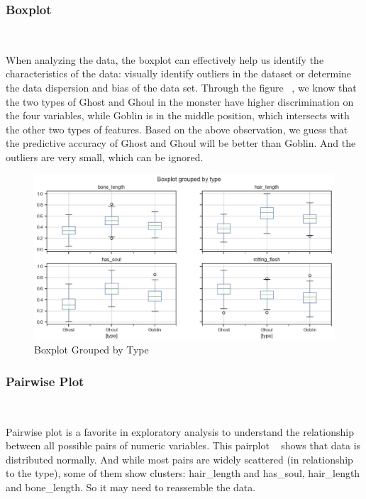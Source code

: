 \subsubsection{Boxplot}
\
 
When analyzing the data, 
the boxplot can effectively 
help us identify the characteristics of the data:
visually identify outliers in the dataset or
determine the data dispersion and 
bias of the data set. 
Through the figure ~, 
we know that the two types of Ghost and Ghoul 
in the monster have higher discrimination 
on the four variables, 
while Goblin is in the middle position, 
which intersects with the other two types of features.
Based on the above observation,
we guess that the predictive accuracy of Ghost and Ghoul 
will be better than Goblin.
And the outliers are very small,
which can be ignored.


\begin{figure}[htbp]
	\centering
	\includegraphics[scale=0.3]{figures/boxplot.eps}
	\caption{Boxplot Grouped by Type}\label{fig:boxplot}
\end{figure}


\subsubsection{Pairwise Plot} 
\

Pairwise plot is 
a favorite in exploratory analysis 
to understand the relationship 
between all possible pairs 
of numeric variables. 
This pairplot ~ 
shows that data is distributed normally. 
And while most pairs are widely scattered 
(in relationship to the type), 
some of them show clusters: 
hair\_length and has\_soul, 
hair\_length and bone\_length. 
So it may need to reassemble the data.

